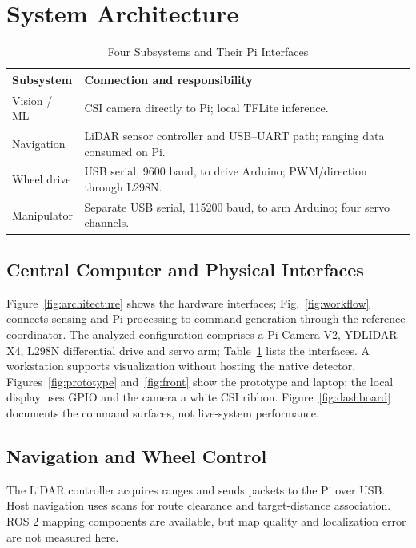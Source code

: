 \section{System Architecture}

\begin{table}[t]
\caption{Four Subsystems and Their Pi Interfaces}
\label{tab:interfaces}
\centering\footnotesize
\begin{tabularx}{\columnwidth}{@{}lX@{}}
\toprule
Subsystem & Connection and responsibility \\
\midrule
Vision / ML & CSI camera directly to Pi; local TFLite inference. \\
Navigation & LiDAR sensor controller and USB--UART path; ranging data consumed on Pi. \\
Wheel drive & USB serial, 9600 baud, to drive Arduino; PWM/direction through L298N. \\
Manipulator & Separate USB serial, 115200 baud, to arm Arduino; four servo channels. \\
\bottomrule
\end{tabularx}
\end{table}

\subsection{Central Computer and Physical Interfaces}
Figure~\ref{fig:architecture} shows the hardware interfaces; Fig.~\ref{fig:workflow} connects sensing and Pi processing to command generation through the reference coordinator. The analyzed configuration comprises a Pi Camera V2, YDLIDAR X4, L298N differential drive and servo arm; Table~\ref{tab:interfaces} lists the interfaces. A workstation supports visualization without hosting the native detector. Figures~\ref{fig:prototype} and~\ref{fig:front} show the prototype and laptop; the local display uses GPIO and the camera a white CSI ribbon. Figure~\ref{fig:dashboard} documents the command surfaces, not live-system performance.

\HazBotWorkflowFigure



\subsection{Navigation and Wheel Control}
The LiDAR controller acquires ranges and sends packets to the Pi over USB. Host navigation uses scans for route clearance and target-distance association. ROS 2 mapping components are available, but map quality and localization error are not measured here.

